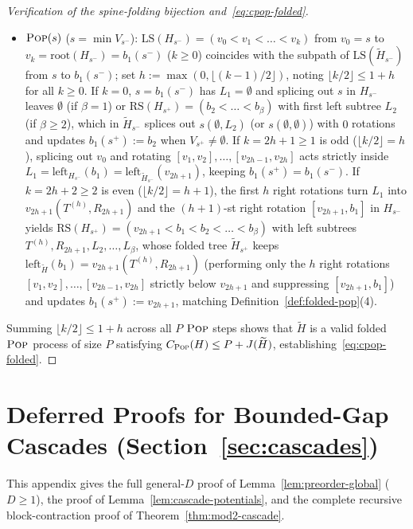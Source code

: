 \documentclass[11pt]{article}
\theoremstyle{definition}
\theoremstyle{remark}
\newcommand{\LS}{\mathrm{LS}}
\newcommand{\RS}{\mathrm{RS}}
\newcommand{\POP}{\textnormal{\scshape Pop}}
\begin{document}
\begin{proof}[Verification of the spine-folding bijection and~\eqref{eq:cpop-folded}]
\begin{itemize}[leftmargin=2em]
  \item $\POP(s)$ ($s = \min V_{s^-}$): $\LS(H_{s^-}) = (v_0 < v_1 < \dots < v_k)$ from $v_0 = s$ to $v_k = \mathrm{root}(H_{s^-}) = b_1(s^-)$ ($k \ge 0$) coincides with the subpath of $\LS(\widetilde{H}_{s^-})$ from $s$ to $b_1(s^-)$; set $h := \max(0, \lfloor (k - 1)/2 \rfloor)$, noting $\lfloor k / 2 \rfloor \le 1 + h$ for all $k \ge 0$. If $k = 0$, $s = b_1(s^-)$ has $L_1 = \emptyset$ and splicing out $s$ in $H_{s^-}$ leaves $\emptyset$ (if $\beta = 1$) or $\RS(H_{s^+}) = (b_2 < \dots < b_\beta)$ with first left subtree $L_2$ (if $\beta \ge 2$), which in $\widetilde{H}_{s^-}$ splices out $s(\emptyset, L_2)$ (or $s(\emptyset, \emptyset)$) with $0$ rotations and updates $b_1(s^+) := b_2$ when $V_{s^+} \ne \emptyset$. If $k = 2h + 1 \ge 1$ is odd ($\lfloor k / 2 \rfloor = h$), splicing out $v_0$ and rotating $[v_1, v_2], \dots, [v_{2h-1}, v_{2h}]$ acts strictly inside $L_1 = \mathrm{left}_{H_{s^-}}(b_1) = \mathrm{left}_{\widetilde{H}_{s^-}}(v_{2h+1})$, keeping $b_1(s^+) = b_1(s^-)$. If $k = 2h + 2 \ge 2$ is even ($\lfloor k / 2 \rfloor = h + 1$), the first $h$ right rotations turn $L_1$ into $v_{2h+1}(T^{(h)}, R_{2h+1})$ and the $(h + 1)$-st right rotation $[v_{2h+1}, b_1]$ in $H_{s^-}$ yields $\RS(H_{s^+}) = (v_{2h+1} < b_1 < b_2 < \dots < b_\beta)$ with left subtrees $T^{(h)}, R_{2h+1}, L_2, \dots, L_\beta$, whose folded tree $\widetilde{H}_{s^+}$ keeps $\mathrm{left}_{\widetilde{H}}(b_1) = v_{2h+1}(T^{(h)}, R_{2h+1})$ (performing only the $h$ right rotations $[v_1, v_2], \dots, [v_{2h-1}, v_{2h}]$ strictly below $v_{2h+1}$ and suppressing $[v_{2h+1}, b_1]$) and updates $b_1(s^+) := v_{2h+1}$, matching Definition~\ref{def:folded-pop}(4).
\end{itemize}
Summing $\lfloor k / 2 \rfloor \le 1 + h$ across all $P$ $\POP$ steps shows that $\widetilde{H}$ is a valid folded $\POP$ process of size $P$ satisfying $C_{\POP}(H) \le P + J(\widetilde{H})$, establishing~\eqref{eq:cpop-folded}.
\end{proof}


\section{Deferred Proofs for Bounded-Gap Cascades (Section~\ref{sec:cascades})}
\label{app:cascade-proofs}

This appendix gives the full general-$D$ proof of Lemma~\ref{lem:preorder-global} ($D \ge 1$), the proof of Lemma~\ref{lem:cascade-potentials}, and the complete recursive block-contraction proof of Theorem~\ref{thm:mod2-cascade}.
\end{document}
